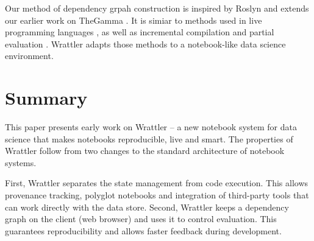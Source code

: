 \documentclass[sigplan]{acmart}\settopmatter{printfolios=true,printccs=false,printacmref=false}
\begin{document}
Our method of dependency grpah construction is inspired by Roslyn \cite{roslyn} and extends our
earlier work on TheGamma \cite{thegamma}. It is simiar to methods used in live programming 
languages \cite{live,subtext}, as well as incremental compilation \cite{incremental} and
partial evaluation \cite{partial}. Wrattler adapts those methods to a notebook-like data
science environment. 

\section{Summary}

This paper presents early work on Wrattler -- a new notebook system for data science that makes
notebooks reproducible, live and smart. The properties of Wrattler follow from two changes to 
the standard architecture of notebook systems. 

First, Wrattler separates the state management from code execution. This allows provenance 
tracking, polyglot notebooks and integration of third-party tools that can work directly with
the data store. Second, Wrattler keeps a dependency graph on the client (web browser) and uses 
it to control evaluation. This guarantees reproducibility and allows faster feedback during
development.



\end{document}
